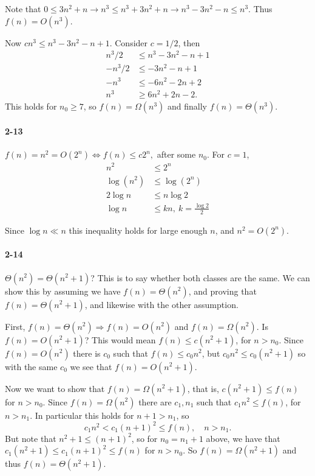 \documentclass{report}
\begin{document}
Note that $0 \le 3n^2 + n \rightarrow n^3 \le n^3 + 3n^2 + n \rightarrow n^3 - 3n^2 - n \le n^3$. Thus $f(n) = O(n^3)$.

Now $cn^3 \le n^3 - 3n^2 - n + 1.$ Consider $c = 1/2$, then
\begin{align*}
	n^3/2 &\le n^3 - 3n^2 - n + 1 \\
	-n^3/2 &\le -3n^2 - n + 1 \\
	-n^3 &\le -6n^2 - 2n + 2 \\
	n^3 &\ge 6n^2 + 2n - 2.
\end{align*}
This holds for $n_0 \ge 7$, so $f(n) = \Omega(n^3)$ and finally $f(n) = \Theta(n^3)$.

\paragraph{2-13}$f(n) = n^2 = O\left(2^n\right) \Leftrightarrow f(n) \le c2^n,$ after some $n_0$. For $c = 1$,
\begin{align*}
	n^2 &\le 2^n \\
	\log(n^2) &\le \log(2^n) \\
	2 \log n &\le n\log 2 \\
	\log n &\le kn,\ k = \frac{\log 2}{2}
\end{align*}

Since $\log n \ll n$ this inequality holds for large enough $n$, and $n^2 = O(2^n)$.

\paragraph{2-14} $\Theta(n^2) = \Theta(n^2+1)$? This is to say whether both classes are the same. We can show this by assuming we have $f(n) = \Theta(n^2)$, and proving that $f(n) = \Theta(n^2+1)$, and likewise with the other assumption.

First, $f(n) = \Theta(n^2) \Rightarrow f(n) = O(n^2)$ and $f(n) = \Omega(n^2)$. Is $f(n) = O(n^2+1)$? This would mean $f(n) \le c\left(n^2+1\right)$, for $n > n_0$. Since $f(n) = O(n^2)$ there is $c_0$ such that $f(n) \le c_0 n^2$, but $c_0 n^2 \le c_0\left(n^2 + 1\right)$ so with the same $c_0$ we see that $f(n) = O(n^2+1)$.

Now we want to show that $f(n) = \Omega(n^2+1)$, that is, $c\left(n^2 + 1\right) \le f(n)$ for $n > n_0$. Since $f(n) = \Omega(n^2)$ there are $c_1, n_1$ such that $c_1 n^2 \le f(n)$, for $n > n_1$. In particular this holds for $n+1 > n_1$, so
\begin{equation*}
	c_1 n^2 < c_1 (n+1)^2 \le f(n), \quad n > n_1.
\end{equation*}
But note that $n^2 + 1 \le (n+1)^2$, so for $n_0 = n_1 + 1$ above, we have that $c_1\left(n^2 + 1\right) \le c_1 (n+1)^2 \le f(n)$ for $n > n_0$. So $f(n) = \Omega(n^2+1)$ and thus $f(n) = \Theta(n^2 + 1)$.
\end{document}
